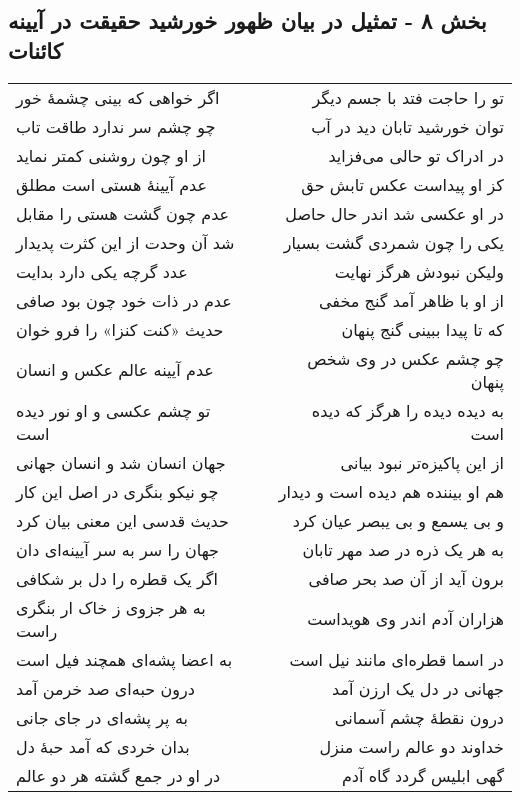 \begin{center}
\section*{بخش ۸ - تمثیل در بیان ظهور خورشید حقیقت در آیینه کائنات}
\label{sec:sh008}
\begin{longtable}{l p{0.5cm} r}
اگر خواهی که بینی چشمهٔ خور
&&
تو را حاجت فتد با جسم دیگر
\\
چو چشم سر ندارد طاقت تاب
&&
توان خورشید تابان دید در آب
\\
از او چون روشنی کمتر نماید
&&
در ادراک تو حالی می‌فزاید
\\
عدم آیینهٔ هستی است مطلق
&&
کز او پیداست عکس تابش حق
\\
عدم چون گشت هستی را مقابل
&&
در او عکسی شد اندر حال حاصل
\\
شد آن وحدت از این کثرت پدیدار
&&
یکی را چون شمردی گشت بسیار
\\
عدد گرچه یکی دارد بدایت
&&
ولیکن نبودش هرگز نهایت
\\
عدم در ذات خود چون بود صافی
&&
از او با ظاهر آمد گنج مخفی
\\
حدیث «کنت کنزا» را فرو خوان
&&
که تا پیدا ببینی گنج پنهان
\\
عدم آیینه عالم عکس و انسان
&&
چو چشم عکس در وی شخص پنهان
\\
تو چشم عکسی و او نور دیده است
&&
به دیده دیده را هرگز که دیده است
\\
جهان انسان شد و انسان جهانی
&&
از این پاکیزه‌تر نبود بیانی
\\
چو نیکو بنگری در اصل این کار
&&
هم او بیننده هم دیده است و دیدار
\\
حدیث قدسی این معنی بیان کرد
&&
و بی یسمع و بی یبصر عیان کرد
\\
جهان را سر به سر آیینه‌ای دان
&&
به هر یک ذره در صد مهر تابان
\\
اگر یک قطره را دل بر شکافی
&&
برون آید از آن صد بحر صافی
\\
به هر جزوی ز خاک ار بنگری راست
&&
هزاران آدم اندر وی هویداست
\\
به اعضا پشه‌ای همچند فیل است
&&
در اسما قطره‌ای مانند نیل است
\\
درون حبه‌ای صد خرمن آمد
&&
جهانی در دل یک ارزن آمد
\\
به پر پشه‌ای در جای جانی
&&
درون نقطهٔ چشم آسمانی
\\
بدان خردی که آمد حبهٔ دل
&&
خداوند دو عالم راست منزل
\\
در او در جمع گشته هر دو عالم
&&
گهی ابلیس گردد گاه آدم
\\

\end{longtable}
\end{center}
